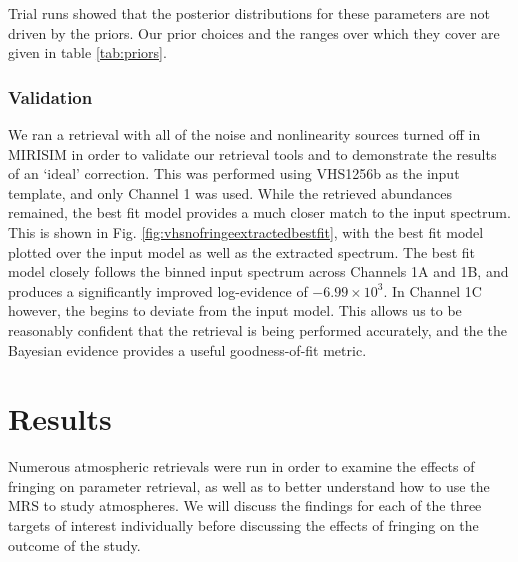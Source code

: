Trial runs showed that the posterior distributions for these parameters are not driven by the priors.
Our prior choices and the ranges over which they cover are given in table \ref{tab:priors}.

\subsubsection{Validation}
We ran a retrieval with all of the noise and nonlinearity sources turned off in MIRISIM in order to validate our retrieval tools and to demonstrate the results of an `ideal' correction. 
This was performed using VHS1256b as the input template, and only Channel 1 was used.
While the retrieved abundances remained, the best fit model provides a much closer match to the input spectrum.
This is shown in Fig. \ref{fig:vhsnofringeextractedbestfit}, with the best fit model plotted over the input model as well as the extracted spectrum.
The best fit model closely follows the binned input spectrum across Channels 1A and 1B, and produces a significantly improved log-evidence of $-6.99\times10^{3}$. 
In Channel 1C however, the begins to deviate from the input model.
This allows us to be reasonably confident that the retrieval is being performed accurately, and the the Bayesian evidence provides a useful goodness-of-fit metric.

\clearpage
\section{Results}
Numerous atmospheric retrievals were run in order to examine the effects of fringing on parameter retrieval, as well as to better understand how to use the MRS to study atmospheres.
We will discuss the findings for each of the three targets of interest individually before discussing the effects of fringing on the outcome of the study.

